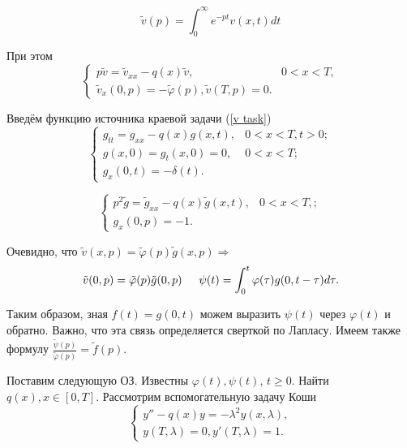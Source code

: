 \documentclass{article}
\begin{document}
\begin{equation*}
\tilde{v}(p) = \int_0^{\infty} e^{-pt} v(x,t) d t
\end{equation*}

При этом 
\begin{equation*}
\begin{cases}
	p \tilde{v} = \tilde{v}_{xx} - q(x) \tilde{v}, & 0<x<T,\\
	\tilde{v}_x(0,p) = -\tilde{\varphi}(p), \tilde{v}(T,p) = 0.
\end{cases}
\end{equation*}

Введём функцию источника краевой задачи (\ref{v task})
\begin{equation*}
\begin{cases}
	g_{tt} = g_{xx} - q(x) g(x,t), & 0<x<T, t > 0;\\
	g(x,0) = g_t(x,0) = 0, & 0<x<T;\\
	g_x(0,t) = -\delta(t).
\end{cases}
\end{equation*}

\begin{equation*}
\begin{cases}
	p^2\tilde{g} = \tilde{g}_{xx} - q(x) \tilde{g}(x,t), & 0<x<T, ;\\
	g_x(0,p) = -1.
\end{cases}
\end{equation*}

Очевидно, что $\tilde{v}(x,p) = \tilde{\varphi}(p) \tilde{g}(x,p) \Rightarrow $
\begin{equation}
\tilde{v}(0,p) = \tilde{\varphi}(p)\tilde{g}(0,p) 
\hspace{0.2cm} ~ \hspace{0.2cm}
\psi (t) = \int_0^t \varphi(\tau) g(0,t-\tau) d \tau.
\end{equation}

Таким образом, зная $f(t) = g(0,t)$ можем выразить $\psi(t)$ через $\varphi(t)$ и обратно. Важно, что эта связь определяется сверткой по Лапласу. Имеем также формулу $\frac{\tilde{\psi}(p)}{\tilde{\varphi}(p)} = \tilde{f}(p)$.

Поставим следующую ОЗ. Известны $\varphi(t), \psi(t)$, $t \geqslant 0$. Найти $q(x), x \in [0,T]$. Рассмотрим вспомогательную задачу Коши
\begin{equation}
\begin{cases}
	y'' - q(x) y = -\lambda^2 y(x,\lambda),\\
	y(T,\lambda) = 0, y'(T,\lambda) = 1.
\end{cases}
\end{equation}
\end{document}
